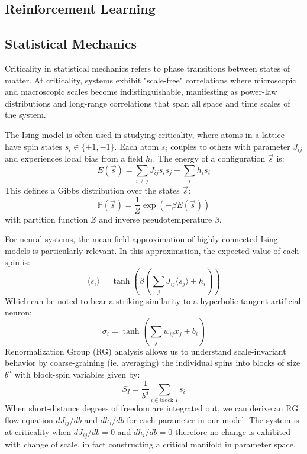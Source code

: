 \subsection{Reinforcement Learning}

\subsection{Statistical Mechanics}

Criticality in statistical mechanics refers to phase transitions between states of matter. At criticality, systems exhibit "scale-free" correlations where microscopic and macroscopic scales become indistinguishable, manifesting as power-law distributions and long-range correlations that span all space and time scales of the system.

The Ising model is often used in studying criticality, where atoms in a lattice have spin states $s_i \in \{+1, -1\}$. Each atom $s_i$ couples to others with parameter $J_{ij}$ and experiences local bias from a field $h_i$. The energy of a configuration $\vec{s}$ is:
\begin{equation}E(\vec{s}) = \sum_{i\neq j} J_{ij} s_is_j + \sum_i h_is_i\end{equation}
This defines a Gibbs distribution over the states $\vec{s}$:
\begin{equation}\mathbb{P}(\vec{s})=\dfrac{1}{Z}\exp(-\beta E(\vec{s}))\end{equation}
with partition function $Z$ and inverse pseudotemperature $\beta$.

For neural systems, the mean-field approximation of highly connected Ising models is particularly relevant. In this approximation, the expected value of each spin is:
\begin{equation}
\langle s_i \rangle = \tanh(\beta(\sum_j J_{ij}\langle s_j \rangle + h_i))
\end{equation}
Which can be noted to bear a striking similarity to a hyperbolic tangent artificial neuron:
\begin{equation}
\sigma_i = \tanh(\sum_j w_{ij}x_j + b_i)
\end{equation}
Renormalization Group (RG) analysis allows us to understand scale-invariant behavior by coarse-graining (ie. averaging) the individual spins into blocks of size $b^d$ with block-spin variables given by:
\begin{equation}
S_I = \frac{1}{b^d}\sum_{i \in \text{block } I} s_i
\end{equation} When short-distance degrees of freedom are integrated out, we can derive an RG flow equation $dJ_{ij}/db$ and $dh_i/db$ for each parameter in our model. The system is at criticality when $dJ_{ij}/db=0$ and $dh_i/db=0$ therefore no change is exhibited with change of scale, in fact constructing a critical manifold in parameter space.

